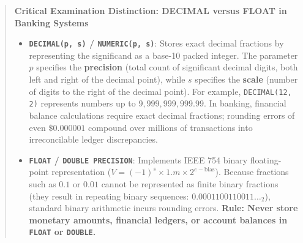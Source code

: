 \begin{quote}
\textbf{Critical Examination Distinction: DECIMAL versus FLOAT in Banking Systems}
\begin{itemize}
    \item \textbf{\texttt{DECIMAL(p, s)} / \texttt{NUMERIC(p, s)}}: Stores exact decimal fractions by representing the significand as a base-10 packed integer. The parameter $p$ specifies the \textbf{precision} (total count of significant decimal digits, both left and right of the decimal point), while $s$ specifies the \textbf{scale} (number of digits to the right of the decimal point). For example, \texttt{DECIMAL(12, 2)} represents numbers up to $9,999,999,999.99$. In banking, financial balance calculations require exact decimal fractions; rounding errors of even $\$0.000001$ compound over millions of transactions into irreconcilable ledger discrepancies.
    \item \textbf{\texttt{FLOAT} / \texttt{DOUBLE PRECISION}}: Implements IEEE 754 binary floating-point representation ($V = (-1)^s \times 1.m \times 2^{e - \text{bias}}$). Because fractions such as $0.1$ or $0.01$ cannot be represented as finite binary fractions (they result in repeating binary sequences: $0.0001100110011\dots_2$), standard binary arithmetic incurs rounding errors. \textbf{Rule: Never store monetary amounts, financial ledgers, or account balances in \texttt{FLOAT} or \texttt{DOUBLE}.}
\end{itemize}
\end{quote}

